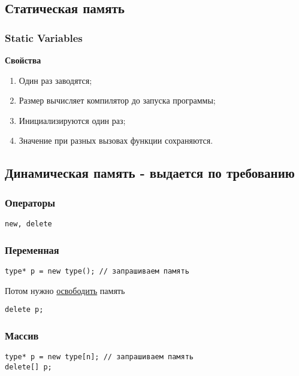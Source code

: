 \documentclass[12pt]{article}
\begin{document}
\subsection{Статическая память}

\subsubsection{Static Variables}

\textbf{Свойства}
\begin{enumerate}
	\item Один раз заводятся;
	\item Размер вычисляет компилятор до запуска программы;
	\item Инициализируются один раз;
	\item Значение при разных вызовах функции сохраняются. 
\end{enumerate}

\subsection[Динамическая память]{Динамическая память - выдается по требованию}

\subsubsection{Операторы}

\texttt{new, delete}

\subsubsection{Переменная}

\begin{lstlisting}
type* p = new type(); // запрашиваем память	
\end{lstlisting}

Потом нужно \underline{освободить} память

\begin{lstlisting}
delete p;
\end{lstlisting}

\subsubsection{Массив}

\begin{lstlisting}
type* p = new type[n]; // запрашиваем память
delete[] p;
\end{lstlisting}
\end{document}
